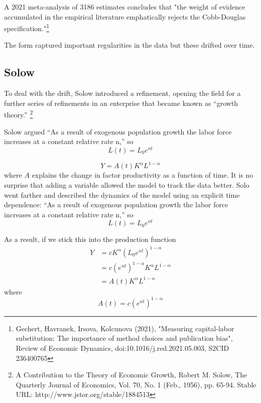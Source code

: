  A 2021 meta-analysis of 3186 estimates concludes that "the weight of evidence accumulated in the empirical literature emphatically rejects the Cobb-Douglas specification."\footnote{Gechert, Havranek, Irsova, Kolcunova (2021), "Measuring capital-labor substitution: The importance of method choices and publication bias", Review of Economic Dynamics, doi:10.1016/j.red.2021.05.003, S2CID 236400765}
 
 The form captured  important regularities in the data but these drifted over time. 
 
 
 
 \subsection{Solow}
To deal with the drift, Solow introduced a refinement, opening the field for a further series of refinements  in an enterprise that became known as ``growth theory.'' \footnote{A Contribution to the Theory of Economic Growth,  Robert M. Solow, The Quarterly Journal of Economics, Vol. 70, No. 1 (Feb., 1956), pp. 65-94. Stable URL: http://www.jstor.org/stable/1884513}

Solow argued ``As a result of exogenous population growth the labor force increases at a constant relative rate n,'' so
  \[L(t)= L_0e^{nt}\]


 \[Y=A(t)K^\alpha L^{1-\alpha}\]
 where $A$  explains the change in factor productivity as a function of time. It is no surprise that adding a variable allowed the model to track the data better. Solo went farther and described the dynamics of the model using an explicit time dependence: ``As a result of exogenous population growth the labor force increases at a constant relative rate n,'' so
  \[L(t)= L_0e^{nt}\]
  
  
 As a result, if we stick this into the production function 
 \begin{eqnarray}
 Y&=cK^\alpha (L_0e^{nt})^{1-\alpha}\\
    &=c(e^{nt})^{1-\alpha}K^\alpha L^{1-\alpha}\\
    &=A(t)K^\alpha L^{1-\alpha} \label{Eq:Solow}
 \end{eqnarray}
 where
 \[A(t)=c(e^{nt})^{1-\alpha}\]
 
